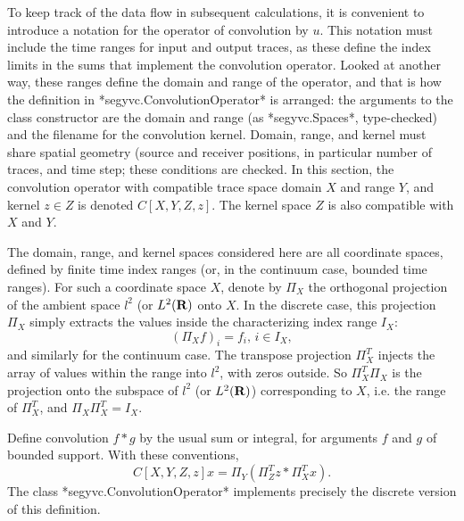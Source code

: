 To keep track of the data flow in subsequent calculations, it is convenient to introduce a notation for the operator of convolution by $u$. This notation must include the time ranges for input and output traces, as these define the index limits in the sums that implement the convolution operator. Looked at another way, these ranges define the domain and range of the operator, and that is how the definition in *segyvc.ConvolutionOperator* is arranged: the arguments to the class constructor are the domain and range (as *segyvc.Spaces*, type-checked) and the filename for the convolution kernel. Domain, range, and kernel must share spatial geometry (source and receiver positions, in particular number of traces, and time step; these conditions are checked. In this section, the convolution operator with compatible trace space domain $X$ and range $Y$, and kernel $z \in Z$ is denoted $C[X,Y,Z,z]$. The kernel space $Z$ is also compatible with $X$ and $Y$.

The domain, range, and kernel spaces considered here are all coordinate spaces, defined by finite time index ranges (or, in the continuum case, bounded time ranges). For such a coordinate space $X$, denote by $\Pi_X$ the orthogonal projection of the ambient space $l^2$ (or $L^2({\bf R})$ onto $X$. In the discrete case, this projection $\Pi_X$ simply extracts the values inside the characterizing index range $I_X$:
$$
(\Pi_X f)_i = f_i, \, i \in I_X,
$$
and similarly for the continuum case. The transpose projection $\Pi_X^T$ injects the array of values within the range into $l^2$, with zeros outside. So $\Pi_X^T\Pi_X$ is the projection onto the subspace of $l^2$ (or $L^2({\bf R})$) corresponding to $X$, i.e. the range of $\Pi_X^T$, and $\Pi_X \Pi_X^T = I_X$.

Define convolution $f*g$ by the usual sum or integral, for arguments $f$ and $g$ of bounded support. With these conventions,
$$
C[X,Y,Z,z]x = \Pi_Y(\Pi_Z^T z * \Pi_X^T x).
$$
The class *segyvc.ConvolutionOperator* implements precisely the discrete version of this definition.

